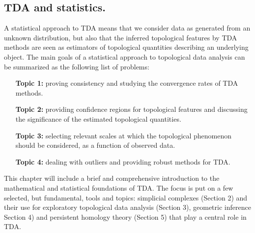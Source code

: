 \subsection{TDA and statistics.}
A statistical approach to TDA means that we consider data as generated from an unknown distribution, but also that the inferred topological features by TDA methods are seen as estimators of topological quantities describing an underlying object. The main goals of a statistical approach to topological data analysis can be summarized as the following list of problems:
\begin{enumerate}
    \item[\textbf{Topic 1:}] proving consistency and studying the convergence rates of TDA methods.
    \item[\textbf{Topic 2:}] providing confidence regions for topological features and discussing the significance of the estimated topological quantities.
    \item[\textbf{Topic 3:}] selecting relevant scales at which the topological phenomenon should be considered, as a function of observed data.
    \item[\textbf{Topic 4:}] dealing with outliers and providing robust methods for TDA.
\end{enumerate}
This chapter will include a brief and comprehensive introduction to the mathematical and statistical foundations of TDA. The focus is put on a few selected, but fundamental, tools and topics:
simplicial complexes (Section 2) and their use for exploratory topological data analysis (Section 3), geometric inference Section 4) and persistent homology theory (Section 5) that play a central role in TDA.